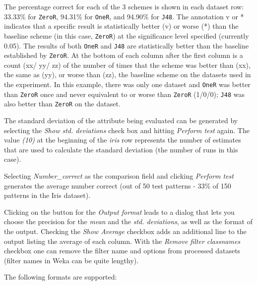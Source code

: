 The percentage correct for each of the 3 schemes is shown in each dataset row: 33.33\% for \texttt{ZeroR}, 94.31\% for \texttt{OneR}, and 94.90\% for \texttt{J48}. The annotation v or * indicates that a specific result is statistically better (v) or worse (*) than the baseline scheme (in this case, \texttt{ZeroR}) at the significance level specified (currently 0.05). The results of both \texttt{OneR} and \texttt{J48} are statistically better than the baseline established by \texttt{ZeroR}. At the bottom of each column after the first column is a count (xx/ yy/ zz) of the number of times that the scheme was better than (xx), the same as (yy), or worse than (zz), the baseline scheme on the datasets used in the experiment. In this example, there was only one dataset and \texttt{OneR} was better than \texttt{ZeroR} once and never equivalent to or worse than \texttt{ZeroR} (1/0/0); \texttt{J48} was also better than \texttt{ZeroR} on the dataset.

The standard deviation of the attribute being evaluated can be generated by selecting the \textit{Show std. deviations} check box and hitting \textit{Perform test} again. The value \textit{(10)} at the beginning of the \textit{iris} row represents the number of estimates that are used to calculate the standard deviation (the number of runs in this case).

\begin{center}
\end{center}

Selecting \textit{Number\_correct} as the comparison field and clicking \textit{Perform test} generates the average number correct (out of 50 test patterns - 33\% of 150 patterns in the Iris dataset).
\begin{center}
\end{center}

Clicking on the button for the \textit{Output format} leads to a dialog that lets you choose the precision for the \textit{mean} and the \textit{std. deviations}, as well as the format of the output. Checking the \textit{Show Average} checkbox adds an additional line to the output listing the average of each column. With the \textit{Remove filter classnames} checkbox one can remove the filter name and options from processed datasets (filter names in Weka can be quite lengthy).

The following formats are supported:

